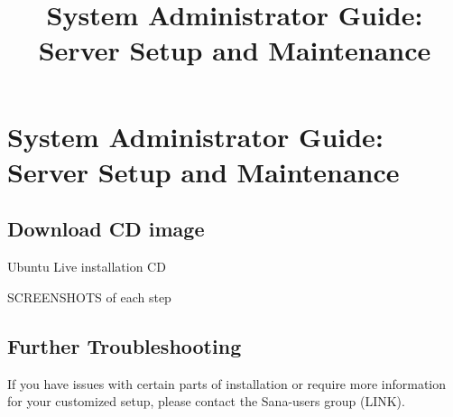 \documentclass[a4paper,10pt]{article}
\title{System Administrator Guide: Server Setup and Maintenance}
\author{}
\begin{document}
\maketitle

\begin{abstract}

\end{abstract}

\section{System Administrator Guide: Server Setup and Maintenance}

\subsection{Download CD image}
Ubuntu Live installation CD

SCREENSHOTS of each step

\subsection{Further Troubleshooting}
If you have issues with certain parts of installation or require more information for your customized setup, please contact the Sana-users group (LINK).



\clearpage{}
\end{document}
